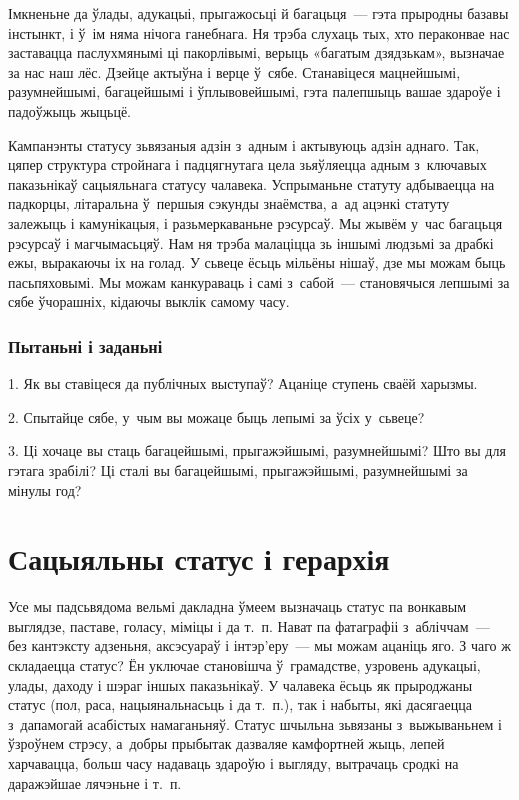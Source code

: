 Імкненьне да ўлады, адукацыі, прыгажосьці й багацьця~--- гэта прыродны базавы інстынкт, і ў~ім няма нічога ганебнага. Ня трэба слухаць тых, хто пераконвае нас заставацца паслухмянымі ці пакорлівымі, верыць «багатым дзядзькам», вызначае за нас наш лёс. Дзейце актыўна і верце ў~сябе. Станавіцеся мацнейшымі, разумнейшымі, багацейшымі і ўплывовейшымі, гэта палепшыць вашае здароўе і падоўжыць жыцьцё.

Кампанэнты статусу зьвязаныя адзін з~адным і актывуюць адзін аднаго. Так, цяпер структура стройнага і падцягнутага цела зьяўляецца адным з~ключавых паказьнікаў сацыяльнага статусу чалавека. Успрыманьне статуту адбываецца на падкорцы, літаральна ў~першыя сэкунды знаёмства, а~ад ацэнкі статуту залежыць і камунікацыя, і разьмеркаваньне рэсурсаў. Мы жывём у~час багацьця рэсурсаў і магчымасьцяў. Нам ня трэба малаціцца зь іншымі людзьмі за драбкі ежы, выракаючы іх на голад. У сьвеце ёсьць мільёны нішаў, дзе мы можам быць пасьпяховымі. Мы можам канкураваць і самі з~сабой~--- становячыся лепшымі за сябе ўчорашніх, кідаючы выклік самому часу.

\subsubsection{Пытаньні і заданьні}

1. Як вы ставіцеся да публічных выступаў? Ацаніце ступень сваёй харызмы.

2. Спытайце сябе, у~чым вы можаце быць лепымі за ўсіх у~сьвеце?

3. Ці хочаце вы стаць багацейшымі, прыгажэйшымі, разумнейшымі? Што вы для гэтага зрабілі? Ці сталі вы багацейшымі, прыгажэйшымі, разумнейшымі за мінулы год?


\section{Сацыяльны статус і герархія}

Усе мы падсьвядома вельмі дакладна ўмеем вызначаць статус па вонкавым выглядзе, паставе, голасу, міміцы і да т.~п. Нават па фатаграфіі з~абліччам~--- без кантэксту адзеньня, аксэсуараў і інтэр'еру~--- мы можам ацаніць яго. З чаго ж складаецца статус? Ён уключае становішча ў~грамадстве, узровень адукацыі, улады, даходу і шэраг іншых паказьнікаў. У чалавека ёсьць як прыроджаны статус (пол, раса, нацыянальнасьць і да т.~п.), так і набыты, які дасягаецца з~дапамогай асабістых намаганьняў. Статус шчыльна зьвязаны з~выжываньнем і ўзроўнем стрэсу, а~добры прыбытак дазваляе камфортней жыць, лепей харчавацца, больш часу надаваць здароўю і выгляду, вытрачаць сродкі на даражэйшае лячэньне і т.~п.

